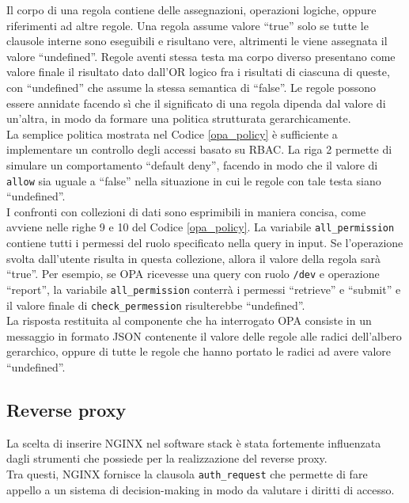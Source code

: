 Il corpo di una regola contiene delle assegnazioni, operazioni logiche, oppure riferimenti ad altre regole. Una regola assume valore ``true'' 
solo se tutte le clausole interne sono eseguibili e risultano vere, altrimenti le viene assegnata il valore ``undefined''. Regole aventi stessa testa ma corpo diverso presentano come valore finale 
il risultato dato dall'OR logico fra i risultati di ciascuna di queste, con ``undefined'' che assume la stessa semantica di ``false''. 
Le regole possono essere annidate facendo sì che il significato di una regola dipenda dal valore di un'altra, in modo da formare una politica strutturata gerarchicamente. 
\\ La semplice politica mostrata nel Codice \ref*{opa_policy} è sufficiente a implementare 
un controllo degli accessi basato su RBAC. 
La riga 2 permette di simulare un comportamento ``default deny'', facendo in modo che il valore di \texttt{allow} sia uguale a ``false'' 
nella situazione in cui le regole con tale testa siano ``undefined''.  \\ 
I confronti con collezioni di dati sono esprimibili in maniera concisa, come avviene nelle righe 9 e 10 del Codice \ref*{opa_policy}. 
La variabile \texttt{all\_permission} contiene tutti i permessi del ruolo specificato nella query in input. 
Se l'operazione svolta dall'utente risulta in questa collezione, allora il valore della regola sarà ``true''. 
Per esempio, se OPA ricevesse una query con ruolo \texttt{/dev} e operazione ``report'', la variabile \texttt{all\_permission} conterrà i permessi 
``retrieve'' e ``submit'' e il valore finale di \texttt{check\_permession} risulterebbe ``undefined''.
\\ La risposta restituita al componente che ha interrogato OPA consiste in un messaggio in formato JSON contenente il valore 
delle regole alle radici dell'albero gerarchico, oppure di tutte le regole che hanno portato le radici ad avere valore ``undefined''. 


\subsection{Reverse proxy}
La scelta di inserire NGINX nel software stack è stata fortemente influenzata dagli strumenti che possiede per la realizzazione 
del reverse proxy. 
\\ Tra questi, NGINX fornisce la clausola \texttt{auth\_request} che permette di fare appello a un sistema di decision-making in modo da valutare
i diritti di accesso. 

